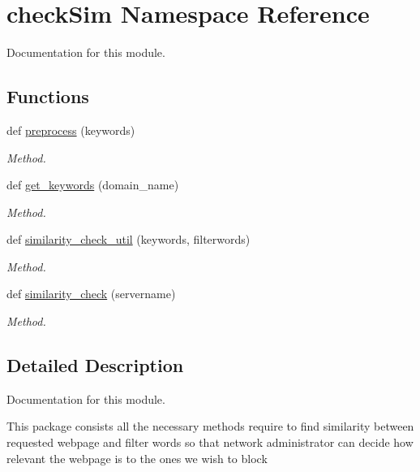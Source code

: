 \hypertarget{namespacecheckSim}{}\section{check\+Sim Namespace Reference}
\label{namespacecheckSim}


Documentation for this module.  


\subsection*{Functions}
\begin{DoxyCompactItemize}
\item 
def \hyperlink{namespacecheckSim_aca6a1a250e7f9dc6df75a433dcdb5d6d}{preprocess} (keywords)
\begin{DoxyCompactList}\small\item\em Method. \end{DoxyCompactList}\item 
def \hyperlink{namespacecheckSim_a83651c0eb2cb80d5549cd9f42cb2ffec}{get\+\_\+keywords} (domain\+\_\+name)
\begin{DoxyCompactList}\small\item\em Method. \end{DoxyCompactList}\item 
def \hyperlink{namespacecheckSim_aca742c80c5db1f197a41e26f60539cec}{similarity\+\_\+check\+\_\+util} (keywords, filterwords)
\begin{DoxyCompactList}\small\item\em Method. \end{DoxyCompactList}\item 
def \hyperlink{namespacecheckSim_a7dce71b3bf75822b4772d9211132f449}{similarity\+\_\+check} (servername)
\begin{DoxyCompactList}\small\item\em Method. \end{DoxyCompactList}\end{DoxyCompactItemize}


\subsection{Detailed Description}
Documentation for this module. 

This package consists all the necessary methods require to find similarity between requested webpage and filter words so that network administrator can decide how relevant the webpage is to the ones we wish to block 

